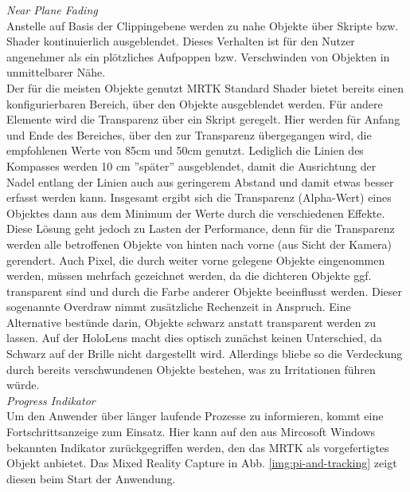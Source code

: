 \textit{Near Plane Fading}\\
Anstelle auf Basis der Clippingebene werden zu nahe Objekte über Skripte bzw. Shader kontinuierlich ausgeblendet. Dieses Verhalten ist für den Nutzer angenehmer als ein plötzliches Aufpoppen bzw. Verschwinden von Objekten in unmittelbarer Nähe.\\

Der für die meisten Objekte genutzt MRTK Standard Shader bietet bereits einen konfigurierbaren Bereich, über den Objekte ausgeblendet werden. Für andere Elemente wird die Transparenz über ein Skript geregelt. Hier werden für Anfang und Ende des Bereiches, über den zur Transparenz übergegangen wird, die empfohlenen Werte von 85cm und 50cm genutzt. Lediglich die Linien des Kompasses werden 10 cm ''später'' ausgeblendet, damit die Ausrichtung der Nadel entlang der Linien auch aus geringerem Abstand und damit etwas besser erfasst werden kann. Insgesamt ergibt sich die Transparenz (Alpha-Wert) eines Objektes dann aus dem Minimum der Werte durch die verschiedenen Effekte.\\

Diese Lösung geht jedoch zu Lasten der Performance, denn für die Transparenz werden alle betroffenen Objekte von hinten nach vorne (aus Sicht der Kamera) gerendert. Auch Pixel, die durch weiter vorne gelegene Objekte eingenommen werden, müssen mehrfach gezeichnet werden, da die dichteren Objekte ggf. transparent sind und durch die Farbe anderer Objekte beeinflusst werden. Dieser sogenannte Overdraw nimmt zusätzliche Rechenzeit in Anspruch. Eine Alternative bestünde darin, Objekte schwarz anstatt transparent werden zu lassen. Auf der HoloLens macht dies optisch zunächst keinen Unterschied, da Schwarz auf der Brille nicht dargestellt wird. Allerdings bliebe so die Verdeckung durch bereits verschwundenen Objekte bestehen, was zu Irritationen führen würde.\\

\textit{Progress Indikator}\\
Um den Anwender über länger laufende Prozesse zu informieren, kommt eine Fortschrittsanzeige zum Einsatz. Hier kann auf den aus Mircosoft Windows bekannten Indikator zurückgegriffen werden, den das MRTK als vorgefertigtes Objekt anbietet. Das Mixed Reality Capture in Abb. \ref{img:pi-and-tracking} zeigt diesen beim Start der Anwendung.\\

